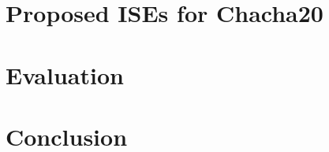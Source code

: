 \documentclass[preprint]{iacrtrans}
\begin{document}
\section{Proposed ISEs for Chacha20}
\label{sec:ise}


\section{Evaluation}
\label{sec:res}


\section{Conclusion}
\label{sec:outro}






\end{document}
